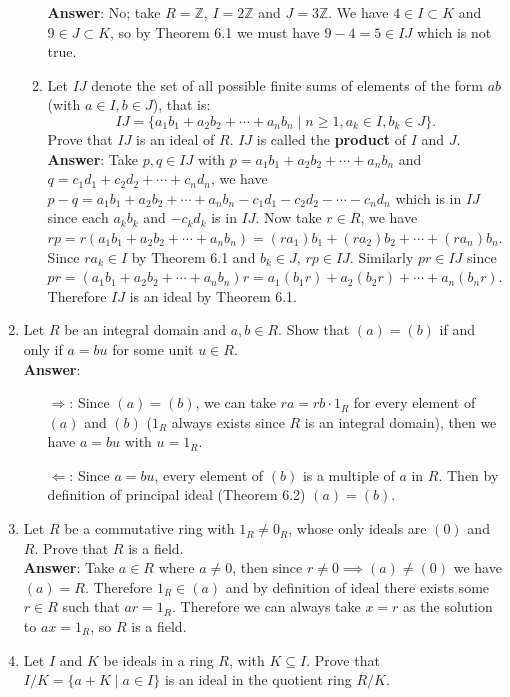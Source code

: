 \documentclass{article}
\begin{document}
\begin{enumerate}
\begin{enumerate}
                        \textbf{Answer}: No; take $R=\mathbb{Z}$, $I=2\mathbb{Z}$ and $J=3\mathbb{Z}$. We have $4\in I\subset K$ and $9\in J\subset K$, so by Theorem 6.1 we must have $9-4=5\in IJ$ which is not true.
                  \item Let $IJ$ denote the set of all possible finite sums of elements of the form $ab$ (with $a\in I, b\in J$), that is: \[IJ=\{a_1b_1+a_2b_2+\cdots+a_nb_n\mid n\geq 1, a_k\in I, b_k\in J\}.\] Prove that $IJ$ is an ideal of $R$. $IJ$ is called the \textbf{product} of $I$ and $J$.\\
                        \textbf{Answer}: Take $p,q\in IJ$ with $p=a_1b_1+a_2b_2+\cdots+a_nb_n$ and $q=c_1d_1+c_2d_2+\cdots+c_nd_n$, we have $p-q=a_1b_1+a_2b_2+\cdots+a_nb_n-c_1d_1-c_2d_2-\cdots-c_nd_n$ which is in $IJ$ since each $a_kb_k$ and $-c_kd_k$ is in $IJ$. Now take $r\in R$, we have $rp=r(a_1b_1+a_2b_2+\cdots+a_nb_n)=(ra_1)b_1+(ra_2)b_2+\cdots+(ra_n)b_n$. Since $ra_k\in I$ by Theorem 6.1 and $b_k\in J$, $rp\in IJ$. Similarly $pr\in IJ$ since $pr=(a_1b_1+a_2b_2+\cdots+a_nb_n)r=a_1(b_1r)+a_2(b_2r)+\cdots+a_n(b_nr)$. Therefore $IJ$ is an ideal by Theorem 6.1.
            \end{enumerate}
      \item Let $R$ be an integral domain and $a,b\in R$. Show that $(a)=(b)$ if and only if $a=bu$ for some unit $u\in R$.\\
            \textbf{Answer}:
            \begin{itemize}
                  \item [$\Rightarrow$:] Since $(a)=(b)$, we can take $ra=rb\cdot 1_R$ for every element of $(a)$ and $(b)$ ($1_R$ always exists since $R$ is an integral domain), then we have $a=bu$ with $u=1_R$.
                  \item [$\Leftarrow$:] Since $a=bu$, every element of $(b)$ is a multiple of $a$ in $R$. Then by definition of principal ideal (Theorem 6.2) $(a)=(b)$.
            \end{itemize}
      \item Let $R$ be a commutative ring with $1_R\neq 0_R$, whose only ideals are $(0)$ and $R$. Prove that $R$ is a field.\\
            \textbf{Answer}: Take $a\in R$ where $a\neq 0$, then since $r\neq 0\implies (a)\neq (0)$ we have $(a)=R$. Therefore $1_R\in (a)$ and by definition of ideal there exists some $r\in R$ such that $ar=1_R$. Therefore we can always take $x=r$ as the solution to $ax=1_R$, so $R$ is a field.
      \item Let $I$ and $K$ be ideals in a ring $R$, with $K\subseteq I$. Prove that $I/K=\{a+K\mid a\in I\}$ is an ideal in the quotient ring $R/K$.\\

\end{enumerate}
\end{document}
